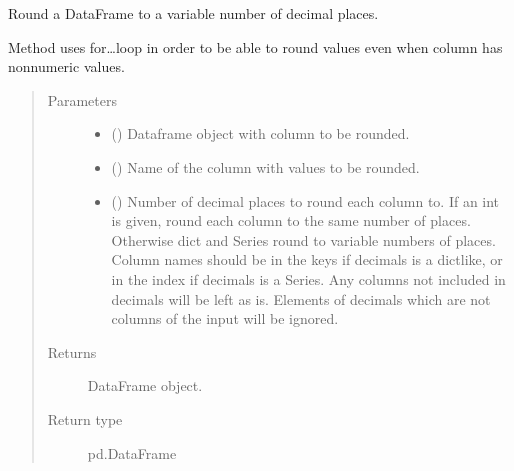 \documentclass[letterpaper,10pt,english]{sphinxmanual}
\begin{document}

\begin{fulllineitems}
\label{\detokenize{source/optimization.opt_tools:optimization.opt_tools.aux_funcs.round_values}}
Round a DataFrame to a variable number of decimal places.

Method uses for…loop in order to be able to round values even when
column has non\sphinxhyphen{}numeric values.
\begin{quote}\begin{description}
\item[{Parameters}] \leavevmode\begin{itemize}
\item {} 
 () \textendash{} Dataframe object with column to be rounded.

\item {} 
 () \textendash{} Name of the column with values to be rounded.

\item {} 
 (\sphinxstyleliteralemphasis{\sphinxupquote{, }}\sphinxstyleliteralemphasis{\sphinxupquote{, }}) \textendash{} Number of decimal places to round each column to.
If an int is given, round each column to the same number of places.
Otherwise dict and Series round to variable numbers of places.
Column names should be in the keys if decimals is a dict\sphinxhyphen{}like, or
in the index if decimals is a Series. Any columns not included in decimals
will be left as is. Elements of decimals which are
not columns of the input will be ignored.

\end{itemize}

\item[{Returns}] \leavevmode
{} \textendash{} DataFrame object.

\item[{Return type}] \leavevmode
pd.DataFrame

\end{description}\end{quote}

\end{fulllineitems}
\end{document}
